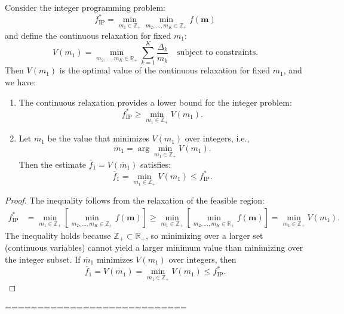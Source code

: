 \begin{theorem}
\label{thm:continuous_lower_bound}
Consider the integer programming problem:
\[
f_{\text{IP}}^* = \min_{m_1 \in \mathbb{Z}_+} \min_{m_2,\dots,m_K \in \mathbb{Z}_+} f(\mathbf{m})
\]
and define the continuous relaxation for fixed $m_1$:
\[
V(m_1) = \min_{m_2,\dots,m_K \in \mathbb{R}_+} \sum_{k=1}^K \frac{\Delta_k}{m_k} 
\quad \text{subject to constraints.}
\]
Then $V(m_1)$ is the optimal value of the continuous relaxation for fixed $m_1$, and we have:

\begin{enumerate}
    \item The continuous relaxation provides a lower bound for the integer problem:
    \[
    f_{\text{IP}}^* \geq \min_{m_1 \in \mathbb{Z}_+} V(m_1).
    \]
    
    \item Let $\overline{m}_1$ be the value that minimizes $V(m_1)$ over integers, i.e.,
    \[
    \overline{m}_1 = \arg\min_{m_1 \in \mathbb{Z}_+} V(m_1).
    \]
    Then the estimate $\overline{f}_1 = V(\overline{m}_1)$ satisfies:
    \[
    \overline{f}_1 = \min_{m_1 \in \mathbb{Z}_+} V(m_1) \leq f_{\text{IP}}^*.
    \]
\end{enumerate}
\end{theorem}

\begin{proof}
The inequality follows from the relaxation of the feasible region:
\begin{align*}
f_{\text{IP}}^* 
&= \min_{m_1 \in \mathbb{Z}_+} \left[ \min_{m_2,\dots,m_K \in \mathbb{Z}_+} f(\mathbf{m}) \right] \geq \min_{m_1 \in \mathbb{Z}_+} \left[ \min_{m_2,\dots,m_K \in \mathbb{R}_+} f(\mathbf{m}) \right] = \min_{m_1 \in \mathbb{Z}_+} V(m_1).
\end{align*}
The inequality holds because $\mathbb{Z}_+ \subset \mathbb{R}_+$, so minimizing over a larger set (continuous variables) cannot yield a larger minimum value than minimizing over the integer subset. If $\overline{m}_1$ minimizes $V(m_1)$ over integers, then
\[
\overline{f}_1  = V(\overline{m}_1) = \min_{m_1 \in \mathbb{Z}_+} V(m_1) \leq f_{\text{IP}}^*.
\]
\end{proof}

============================








